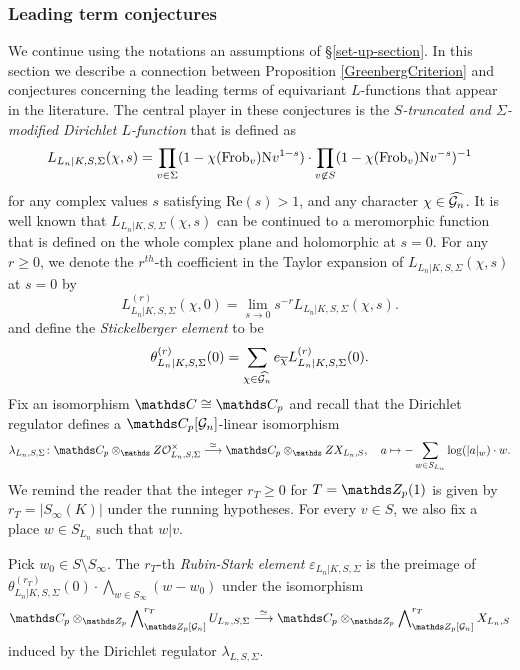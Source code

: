 \documentclass[a4paper, 
headsepline=off, DIV=12, titlepage=false]{scrartcl}
\begin{document}
\subsubsection{Leading term conjectures}

We continue using the notations an assumptions of \S \ref{set-up-section}. In this section we describe a connection between Proposition \ref{GreenbergCriterion} and conjectures concerning the leading terms of equivariant $L$-functions that appear in the literature. The central player in these conjectures is the \textit{$S$-truncated and $\Sigma$-modified Dirichlet $L$-function} that is defined as
\[
L_{L_n | K, S, \Sigma} (\chi, s) = \prod_{v \in \Sigma} (1 - \chi ( \mathrm{Frob}_v) \text{N}v^{1 - s} ) \cdot \prod_{v \not \in S} (1 - \chi (\mathrm{Frob}_v) \text{N}v^{-s} )^{-1}
\]
for any complex values $s$ satisfying $\text{Re} (s) > 1$, and any character $\chi \in \widehat{\mathcal{G}_n}$. It is well known that $L_{L_n | K, S, \Sigma} (\chi, s)$ can be continued to a meromorphic function that is defined on the whole complex plane and holomorphic at $s = 0$. For any $r \geq 0$, we denote the $r^{th}$-th coefficient in the Taylor expansion of $L_{L_n | K, S, \Sigma}  (\chi, s)$ at $s = 0$ by 
\[
L^{(r)}_{L_n | K, S, \Sigma} (\chi, 0) = \lim_{s \to 0} s^{-r} L_{L_n | K, S, \Sigma}  (\chi, s). 
\]
and define the \textit{Stickelberger element} to be
\[
\theta_{L_n | K, S, \Sigma}^{(r)} (0) = \sum_{\chi \in \widehat{\mathcal{G}_n}} e_{\overline{\chi}} L_{L_n | K, S, \Sigma}^{(r)} (0).
\]
Fix an isomorphism $\C \cong \C_p$ and recall that the Dirichlet regulator defines a $\C_p [\cG_n]$-linear isomorphism
\[
\lambda_{L_n, S, \Sigma} \: \C_p \otimes_\Z \bigO_{L_n, S, \Sigma}^\times 
\stackrel{\simeq}{\longrightarrow}
\C_p \otimes_\Z X_{L_n, S}, 
\quad
a \mapsto - \sum_{w \in S_{L_n}} \log (| a|_w ) \cdot w.
\]
We remind the reader that the integer $r_T \geq 0$ for $T = \Z_p (1)$ is given by $r_T = | S_\infty (K) |$ under the running hypotheses. For every $v \in S$, we also fix a place $w \in S_{L_n}$ such that $w | v$. 
\begin{definition}
Pick $w_0 \in S \setminus S_\infty$.
The $r_T$-th \textit{Rubin-Stark element} $\varepsilon_{L_n | K, S, \Sigma}$ is the preimage of $\theta^{(r_T)}_{L_n | K, S, \Sigma} (0) \cdot \bigwedge_{w \in S_\infty} (w - w_0)$
under the isomorphism
\[
\C_p \otimes_{\Z_p} \exprod^{r_T}_{\Z_p [\cG_n]} U_{L_n, S, \Sigma} \stackrel{\simeq}{\longrightarrow} \C_p \otimes_{\Z_p} \exprod^{r_T}_{\Z_p [\cG_n]} X_{L_n, S}
\]
induced by the Dirichlet regulator $\lambda_{L, S, \Sigma}$.
\end{definition}
\end{document}
